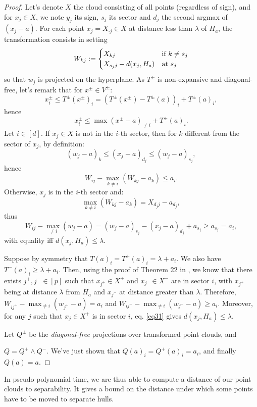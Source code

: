 \documentclass[oneside,english,a4paper]{amsart}
\numberwithin{equation}{section}
\numberwithin{figure}{section}
\theoremstyle{plain}
\theoremstyle{definition}
\theoremstyle{plain}
\theoremstyle{remark}
\theoremstyle{plain}
\theoremstyle{definition}
\theoremstyle{definition}
\begin{document}
\begin{proof}
Let's denote $X$ the cloud consisting of all points (regardless of
sign), and for $x_{j}\in X$, we note $y_{j}$ its sign, $s_{j}$
its sector and $d_{j}$ the second argmax of $(x_{j}-a)$. For each
point $x_{j}=X_{\cdot j}\in X$ at distance less than $\lambda$ of
$H_{a}$, the transformation consists in setting 
\[
W_{kj}:=\begin{cases}
X_{kj} & \text{if \ensuremath{k\ne s_{j}}}\\
X_{s_{j}j}-d(x_{j},H_{a}) & \text{at \ensuremath{s_{j}}}
\end{cases}
\]
so that $w_{j}$ is projected on the hyperplane. As $T^{\pm}$ is
non-expansive and diagonal-free, let's remark that for $x^{\pm}\in V^{\pm}$:
\[
x_{i}^{\pm}\le T^{\pm}(x^{\pm})_{i}=\left(T^{\pm}(x^{\pm})-T^{\pm}(a)\right)_{i}+T^{\pm}(a)_{i},
\]
hence
\begin{equation}
x_{i}^{\pm}\le\max(x^{\pm}-a)_{\ne i}+T^{\pm}(a)_{i}.\label{eq31}
\end{equation}
Let $i\in[d]$. If $x_{j}\in X$ is not in the $i$-th sector, then
for $k$ different from the sector of $x_{j}$, by definition: 
\[
(w_{j}-a)_{k}\le(x_{j}-a)_{d_{j}}\le(w_{j}-a)_{s_{j}},
\]
hence 
\[
W_{ij}-\max_{k\ne i}\left(W_{kj}-a_{k}\right)\le a_{i}.
\]
Otherwise, $x_{j}$ is in the $i$-th sector and: 
\[
\max_{k\ne i}\left(W_{kj}-a_{k}\right)=X_{d_{j}j}-a_{d_{j}},
\]
thus 
\[
W_{ij}-\max_{\ne i}\left(w_{j}-a\right)=\left(w_{j}-a\right)_{s_{j}}-\left(x_{j}-a\right)_{d_{j}}+a_{s_{j}}\ge a_{s_{j}}=a_{i},
\]
with equality iff $d(x_{j},H_{a})\leq\lambda$.

Suppose by symmetry that $T(a)_{i}=T^{+}(a)_{i}=\lambda+a_{i}.$ We
also have $T^{-}(a)_{i}\ge\lambda+a_{i}$. Then, using the proof of
Theorem 22 in \cite{Akian2021TropicalLR}, we know that there exists
$j^{+},j^{-}\in[p]$ such that $x_{j^{+}}\in X^{+}$ and $x_{j^{-}}\in X^{-}$
are in sector $i$, with $x_{j^{+}}$ being at distance $\lambda$
from $H_{a}$ and $x_{j^{-}}$ at distance greater than $\lambda$.
Therefore, $W_{ij^{+}}-\max_{\ne i}\left(w_{j^{+}}-a\right)=a_{i}$
and $W_{ij^{-}}-\max_{\ne i}\left(w_{j^{-}}-a\right)\geq a_{i}$.
Moreover, for any $j$ such that $x_{j}\in X^{+}$ is in sector $i$,
eq. \ref{eq31} gives $d(x_{j},H_{a})\leq\lambda$.

Let $Q^{\pm}$ be the \emph{diagonal-free} projections over transformed
point clouds, and

$Q=Q^{+}\wedge Q^{-}.$ We've just shown that $Q(a)_{i}=Q^{+}(a)_{i}=a_{i}$,
and finally $Q(a)=a$.
\end{proof}
%
In pseudo-polynomial time, we are thus able to compute a distance
of our point clouds to separability. It gives a bound on the distance
under which some points have to be moved to separate hulls.
\end{document}
